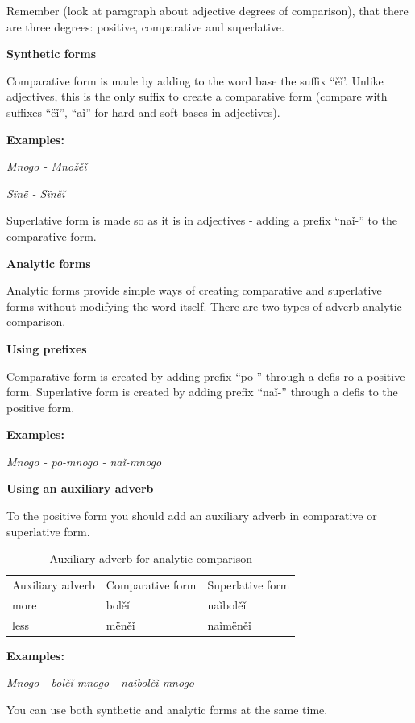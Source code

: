 Remember (look at paragraph about adjective degrees of comparison), that there are three degrees: positive, comparative and superlative.

\textbf{Synthetic forms}

Comparative form is made by adding to the word base the suffix “ěǐ’. Unlike adjectives, this is the only suffix to create a comparative form (compare with suffixes “ëǐ”, “aǐ” for hard and soft bases in adjectives). 

\textbf{Examples:}

\textit{Mnogo - Množěǐ}

\textit{Sïnë - Sïněǐ}

Superlative form is made so as it is in adjectives - adding a prefix “naǐ-” to the comparative form.

\textbf{Analytic forms}

Analytic forms provide simple ways of creating comparative and superlative forms without modifying the word itself. There are two types of adverb analytic comparison.

\textbf{Using prefixes}

Comparative form is created by adding prefix “po-” through a defis ro a positive form. Superlative form is created by adding prefix “naǐ-” through a defis to the positive form.

\textbf{Examples:}

\textit{Mnogo - po-mnogo - naǐ-mnogo}

\textbf{Using an auxiliary adverb}

To the positive form you should add an auxiliary adverb in comparative or superlative form.

\begin{table}[!htb]
	\caption{Auxiliary adverb for analytic comparison}
	\begin{tabular}{lll}
		Auxiliary adverb
		& Comparative form
		& Superlative form \\
		more & bolěǐ & naǐbolěǐ \\
		less & mëněǐ & naǐmëněǐ \\
	\end{tabular}
\end{table}

\textbf{Examples:}

\textit{Mnogo - bolěǐ mnogo - naǐbolěǐ mnogo}

You can use both synthetic and analytic forms at the same time.
